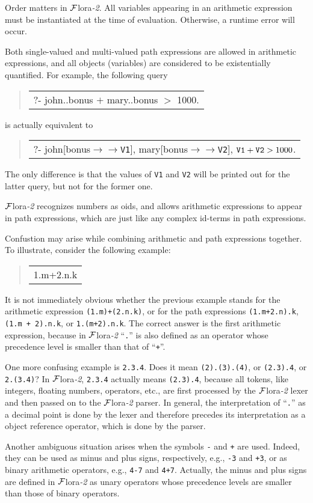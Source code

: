 \documentclass[11pt]{article}
\newenvironment{qrules}{\begin{quote}\sf\begin{tabular}[t]{l}}%
{\end{tabular}\end{quote}}
\newcommand{\mvd}{\ensuremath{{\rightarrow\!\!\!\!\rightarrow}}}  %
\newcommand{\FLORA}{{\mbox{${\cal F}${\sc lora}\rm\emph{-2}}}\xspace}
\begin{document}
Order matters in \FLORA. All variables appearing in an arithmetic
expression must be instantiated at the time of evaluation. Otherwise,
a runtime error will occur.

Both single-valued and multi-valued path expressions are allowed in
arithmetic expressions, and all objects (variables) are considered to
be existentially quantified. For example, the following query
\begin{qrules}
?- john..bonus $+$ mary..bonus $>$ 1000.
\end{qrules}
is actually equivalent to
\begin{qrules}
?- john[bonus{\mvd}{\tt V1}], mary[bonus{\mvd}{\tt V2}], ${\tt V1}+{\tt V2} > 1000$.
\end{qrules}
The only difference is that the values of {\tt V1} and {\tt V2} will be
printed out for the latter query, but not for the former one.

\FLORA recognizes numbers as oids, and allows arithmetic expressions
to appear in path expressions, which are just like any complex id-terms
in path expressions.

Confustion may arise while combining arithmetic and path expressions together.
To illustrate, consider the following example:
\begin{qrules}
1.m+2.n.k
\end{qrules}
It is not immediately obvious whether the previous
example stands for the arithmetic expression {\tt (1.m)+(2.n.k)}, or for the
path expressions {\tt (1.m+2.n).k}, {\tt (1.m + 2).n.k}, or {\tt 1.(m+2).n.k}.
The correct answer is the first arithmetic expression, because in \FLORA
``{\tt .}'' is also defined as an operator whose precedence level is smaller
than that of ``{\tt +}''.

One more confusing example is {\tt 2.3.4}. Does it mean {\tt (2).(3).(4)}, or
{\tt (2.3).4}, or {\tt 2.(3.4)}?  In \FLORA, {\tt 2.3.4} actually means
{\tt (2.3).4}, because all tokens, like integers, floating numbers,
operators, etc., are first processed by the \FLORA lexer and then passed on to
the \FLORA parser. In general, the interpretation of ``{\tt .}'' as a decimal
point is done by the lexer and therefore precedes its interpretation as a object
reference operator, which is done by the parser.

Another ambiguous situation arises when the symbols {\tt -} and {\tt +}
are used.  Indeed, they can be used as minus and plus signs,
respectively, e.g., {\tt -3} and {\tt +3}, or as binary arithmetic
operators, e.g., {\tt 4-7} and {\tt 4+7}. Actually, the minus and plus
signs are defined in \FLORA as unary operators whose precedence levels
are smaller than those of binary operators.
\end{document}
